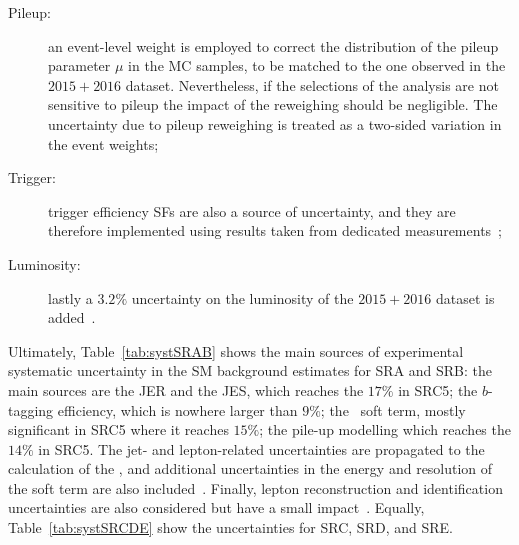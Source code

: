 \begin{description}
				\item [Pileup:] an event-level weight is employed to correct the distribution of the pileup parameter $\mu$ in the \ac{MC} samples, to be matched to the one observed in the $2015+2016$ dataset. Nevertheless, if the selections of the analysis are not sensitive to pileup the impact of the reweighing should be negligible. The uncertainty due to pileup reweighing is treated as a two-sided variation in the event weights;

				\item [Trigger:] trigger efficiency \acp{SF} are also a source of uncertainty, and they are therefore implemented using results taken from dedicated measurements~\cite{ATLASTrigger2015};

				\item [Luminosity:] lastly a $3.2\%$ uncertainty on the luminosity of the $2015+2016$ dataset is added~\cite{ATLAS2013lumi}.
			\end{description}

			Ultimately, Table~\ref{tab:systSRAB} shows the main sources of experimental systematic uncertainty in the \ac{SM} background estimates for SRA and SRB: the main sources are the \ac{JER} and the \ac{JES}, which reaches the $17\%$ in SRC5; the $b$-tagging efficiency, which is nowhere larger than $9\%$; the \met\ soft term, mostly significant in SRC5 where it reaches $15\%$; the pile-up modelling which reaches the $14\%$ in SRC5. The jet- and lepton-related uncertainties are propagated to the calculation of the \met, and additional uncertainties in the energy and resolution of the soft term are also included~\cite{met}. Finally, lepton reconstruction and identification uncertainties are also considered but have a small impact~\cite{stop0L}. Equally, Table~\ref{tab:systSRCDE} show the uncertainties for SRC, SRD, and SRE.

